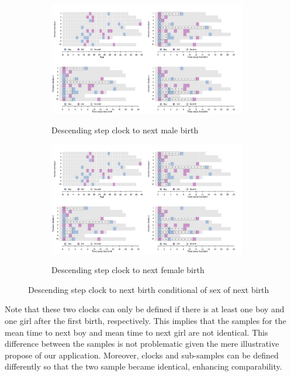 \documentclass[a4paper,left=1.25cm,right=1.25cm,top=1.25cm,bottom=1.25cm]{article}
\begin{document}
\begin{figure}[H]
   \begin{subfigure}{\textwidth}
      \centering
   \includegraphics[trim=0cm 0cm 17.6cm 10cm, clip, width=0.95\textwidth]{Spells/Figures/colombia/illu_fertility.pdf}\\
    \caption{Descending step clock to next male birth}
    \label{fert_clockb}
    \end{subfigure}
    
       \begin{subfigure}{\textwidth}
      \centering
    \includegraphics[trim=17.4cm 0cm 0cm 10cm, clip, width=0.95\textwidth]{Spells/Figures/colombia/illu_fertility.pdf}\\
    \caption{Descending step clock to next female birth}
    \label{fert_clockg}
    \end{subfigure}
    \label{fert_clock}
    \caption{Descending step clock to next birth conditional of sex of next birth}
\end{figure}

Note that these two clocks can only be defined if there is at least one boy and one girl after the first birth, respectively. This implies that the samples for the mean time to next boy and mean time to next girl are not identical. This difference between the samples is not problematic given the mere illustrative propose of our application. Moreover, clocks and sub-samples can be defined differently so that the two sample became identical, enhancing comparability.
\end{document}
